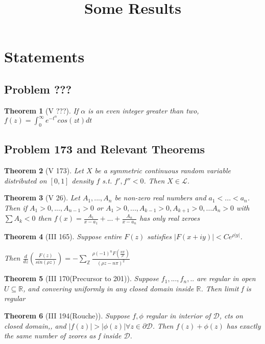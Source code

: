 \documentclass[10pt]{article}
\title{\vspace{-3em}Some Results}
\newcommand{\1}{\textbf{1}}
\newcommand{\R}{\mathbb{R}}
\newcommand{\Z}{\mathbb{Z}}
\newcommand{\lL}{\mathcal{L}}
\newtheorem{theorem}{Theorem}
\theoremstyle{remark}
\theoremstyle{definition}
\begin{document}
\section{Statements}

\subsection{Problem ???}

\begin{theorem}[V ???]
	If $\alpha$ is an even integer greater than two, $f(z) = \int_0^{\infty} e^{-t^{\alpha}}cos(zt)dt$
\end{theorem}

\subsection{Problem 173 and Relevant Theorems}


\begin{theorem}[V 173] \label{173}
	Let $X$ be a symmetric continuous random variable distributed on $[0,1]$ density $f$ s.t. $f',f'' < 0$. Then $X \in \lL$.
\end{theorem}

\begin{theorem}[V 26] \label{26}
	Let $A_1,...,A_n$ be non-zero real numbers and $a_1 < ... < a_n$. Then if $A_1 >0, ..., A_{n-1}>0$ or $A_1 > 0,..., A_{k-1} > 0, A_{k+1}>0,... A_n > 0$ with $\sum A_k < 0$ then $f(x) =\frac{A_1}{x-a_1} + ... + \frac{A_n}{x-a_n}$ has only real zeroes
\end{theorem}

\begin{theorem}[III 165]
	Suppose entire $F(z)$ satisfies $|F(x+iy)| < Ce^{\rho |y|}$. 

	Then $\frac{d}{dz}(\frac{F(z)}{sin(\rho z)}) = -\sum_{\Z} \frac{\rho (-1)^n F(\frac{n \pi }{\rho})}{(\rho z - n \pi)^2}$
\end{theorem}

\begin{theorem}[III 170(Precursor to 201)]
	Suppose $f_1, ..., f_n,..$ are regular in open $U \subseteq \mathbb{R}$, and convering uniformly in any closed domain inside $\R$. Then limit f is regular
\end{theorem}

\begin{theorem}[III 194(Rouche)]
	Suppose $f,\phi$ regular in interior of $\mathcal{D}$, cts on closed domain,, and $|f(z)| > |\phi(z)| \forall z \in \partial \mathcal{D}$. Then $f(z)+\phi(z)$ has exactly the same number of zeores as f inside $\mathcal{D}$.
\end{theorem}
\end{document}

